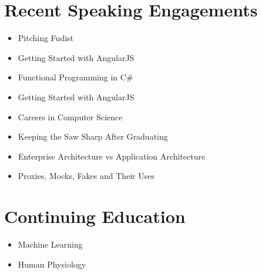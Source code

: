 \documentclass[12pt,letterpaper,sans]{moderncv}
\begin{document}
\newpage
\section{Recent Speaking Engagements}
    \begin{itemize}[leftmargin=1.24in]
        \item Pitching Fudist
    \end{itemize}
    \begin{itemize}[leftmargin=1.24in]
        \item Getting Started with AngularJS
    \end{itemize}
    \begin{itemize}[leftmargin=1.24in]
        \item Functional Programming in C\#
        \item Getting Started with AngularJS
    \end{itemize}
    \begin{itemize}[leftmargin=1.24in]
        \item Careers in Computer Science
        \item Keeping the Saw Sharp After Graduating
    \end{itemize}
    \begin{itemize}[leftmargin=1.24in]
        \item Enterprise Architecture vs Application Architecture
        \item Proxies, Mocks, Fakes and Their Uses
    \end{itemize}


\section{Continuing Education}
    \begin{itemize}[leftmargin=1.24in]
        \item Machine Learning
    \end{itemize}
    \begin{itemize}[leftmargin=1.24in]
        \item Human Physiology
    \end{itemize}
\end{document}
